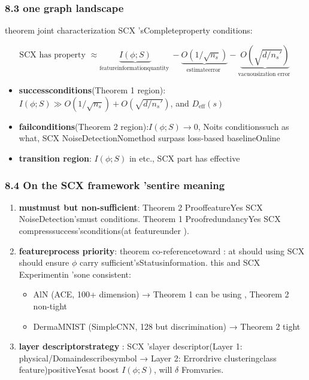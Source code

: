 \documentclass[
  12pt,
]{article}
\providecommand{\tightlist}{%
  \setlength{\itemsep}{0pt}\setlength{\parskip}{0pt}}
\begin{document}
\subsubsection{8.3 one graph landscape}\label{ux7edfux4e00ux56feux666f}

theorem joint characterization SCX 'sCompleteproperty conditions:

\[\text{SCX has property } \approx \underbrace{I(\phi; S)}_{\text{featureinformationquantity }} - \underbrace{O(1/\sqrt{n_s})}_{\text{estimateerror }} - \underbrace{O(\sqrt{d/n_s'})}_{\text{vacuousization error }}\]

\begin{itemize}
\tightlist
\item
  \textbf{successconditions}(Theorem 1
  region):\(I(\phi; S) \gg O(1/\sqrt{n_s}) + O(\sqrt{d/n_s'})\), and 
  \(D_{\text{eff}}(s)\) 
\item
  \textbf{failconditions}(Theorem 2
  region):\(I(\phi; S) \to 0\), Noits conditionssuch as what, SCX
  NoiseDetectionNomethod surpass loss-based baselineOnline 
\item
  \textbf{transition region}: \(I(\phi; S)\) in etc., SCX part has effective
\end{itemize}

\subsubsection{8.4 On the SCX
framework 'sentire meaning}\label{ux5bf9-scx-ux6846ux67b6ux7684ux6574ux4f53ux610fux4e49}

\begin{enumerate}
\def\labelenumi{\arabic{enumi}.}
\item
  \textbf{mustmust but non-sufficient}: Theorem 2 ProoffeatureYes SCX
  NoiseDetection'smust conditions. Theorem 1 ProofredundancyYes SCX
  compresssuccess'sconditions(at featureunder ). 
\item
  \textbf{featureprocess priority}: theorem co-referencetoward : at should using  SCX should ensure  \(\phi\)
  carry sufficient'sStatusinformation. this and  SCX Experimentin 'sone consistent: 

  \begin{itemize}
  \tightlist
  \item
    AlN (ACE, 100+ dimension) → Theorem 1 can be using , Theorem 2 non-tight
  \item
    DermaMNIST (SimpleCNN, 128 but discrimination) → Theorem 2 tight
  \end{itemize}
\item
  \textbf{layer descriptorstrategy }: SCX 'slayer descriptor(Layer 1: physical/Domaindescribesymbol →
  Layer 2: Errordrive clusteringclass feature)positiveYesat boost  \(I(\phi; S)\), will  \(\delta\)
  Fromvaries. 
\end{enumerate}
\end{document}
